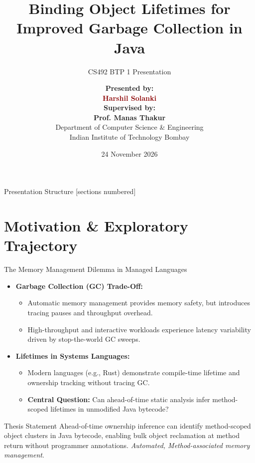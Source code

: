 \documentclass[11pt]{beamer}
\title[DOSA: Static Ownership Inference]{Binding Object Lifetimes for Improved Garbage Collection in Java}
\subtitle{CS492 BTP 1 Presentation}
\author[Harshil Solanki]{%
  \textbf{Presented by:}\\[0.15em]
  \textcolor{darkred}{\textbf{Harshil Solanki}}\\[0.45em]
  \textbf{Supervised by:}\\[0.15em]
  \textbf{Prof. Manas Thakur}\\[0.3em]
  \small Department of Computer Science \& Engineering\\
  \small Indian Institute of Technology Bombay
}
\institute[IIT Bombay]{IIT Bombay}
\date{24 November 2026}
\begin{document}
\begin{frame}[plain]
  \titlepage
\end{frame}

\begin{frame}{Presentation Structure}
  [sections numbered]
  \tableofcontents
\end{frame}

\section[Motivation \& Background]{Motivation \& Exploratory Trajectory}

\begin{frame}{The Memory Management Dilemma in Managed Languages}
  \begin{itemize}
    \item \textbf{Garbage Collection (GC) Trade-Off:}
      \begin{itemize}
        \item Automatic memory management provides memory safety, but introduces tracing pauses and throughput overhead.
        \item High-throughput and interactive workloads experience latency variability driven by stop-the-world GC sweeps.
      \end{itemize}
    \item \textbf{Lifetimes in Systems Languages:}
      \begin{itemize}
        \item Modern languages (e.g., Rust) demonstrate compile-time lifetime and ownership tracking without tracing GC.
        \item \textbf{Central Question:} Can ahead-of-time static analysis infer method-scoped lifetimes in unmodified Java bytecode?
      \end{itemize}
  \end{itemize}
  
  \begin{block}{Thesis Statement}
    \small
    Ahead-of-time ownership inference can identify method-scoped object clusters in Java bytecode, enabling bulk object reclamation at method return without programmer annotations. \textit{Automated, Method-associated memory management}.
  \end{block}
\end{frame}
\end{document}
